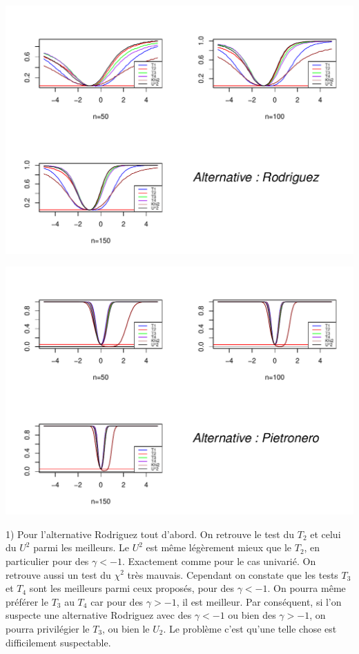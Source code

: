 \documentclass[12pt,a4paper]{article}
\begin{document}
\begin{center}
\includegraphics[scale=1]{Rplot1.pdf}
\end{center}
\begin{center}
\includegraphics[scale=1]{Rplot2.pdf} 
\end{center}


1) Pour l'alternative Rodriguez tout d'abord. On retrouve le test du $T_{2}$ et celui du $U^{2}$ parmi les meilleurs. Le $U^{2}$ est même légèrement mieux que le $T_{2}$, en particulier pour des $\gamma < -1$. Exactement comme pour le cas univarié. On retrouve aussi un test du $\chi^{2}$ très mauvais. Cependant on constate que les tests $T_{3}$ et $T_{4}$ sont les meilleurs parmi ceux proposés, pour des $\gamma < -1$. On pourra même préférer le $T_{3}$ au $T_{4}$ car pour des $\gamma > -1$, il est meilleur. Par conséquent, si l'on suspecte une alternative Rodriguez avec des $\gamma < -1$ ou bien des $\gamma > -1$, on pourra privilégier le $T_{3}$, ou bien le $U_{2}$. Le problème c'est qu'une telle chose est difficilement suspectable. \\
\end{document}
